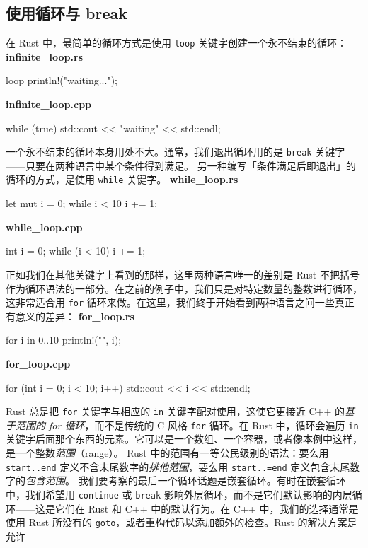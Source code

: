\subsection{使用循环与 break}
\label{idx:idx_4c4b7ee7}
在 Rust 中，最简单的循环方式是使用 \texttt{loop} 关键字创建一个永不结束的循环：
\textbf{infinite\_\allowbreak{}loop.\allowbreak{}rs}
\begin{codebox}[text]
loop {
    println!("waiting...");
}
\end{codebox}
\textbf{infinite\_\allowbreak{}loop.\allowbreak{}cpp}
\begin{codebox}[rust]
while (true) {
    std::cout << "waiting" << std::endl;
}
\end{codebox}
一个永不结束的循环本身用处不大。通常，我们退出循环用的是
\label{idx:idx_7ab2df65}
\texttt{break} 关键字——只要在两种语言中某个条件得到满足。
另一种编写「条件满足后即退出」的循环的方式，是使用 \texttt{while} 关键字。
\textbf{while\_\allowbreak{}loop.\allowbreak{}rs}
\begin{codebox}[rust]
let mut i = 0;
while i < 10 {
    i += 1;
}
\end{codebox}
\textbf{while\_\allowbreak{}loop.\allowbreak{}cpp}
\begin{codebox}[text]
int i = 0;
while (i < 10) {
    i += 1;
}
\end{codebox}
\label{idx:idx_59fd020e}
正如我们在其他关键字上看到的那样，这里两种语言唯一的差别是 Rust 不把括号作为循环语法的一部分。在之前的例子中，我们只是对特定数量的整数进行循环，这非常适合用 \texttt{for} 循环来做。在这里，我们终于开始看到两种语言之间一些真正有意义的差异：
\textbf{for\_\allowbreak{}loop.\allowbreak{}rs}
\begin{codebox}[text]
for i in 0..10 {
    println!("{}", i);
}
\end{codebox}
\textbf{for\_\allowbreak{}loop.\allowbreak{}cpp}
\begin{codebox}[rust]
for (int i = 0; i < 10; i++) {
    std::cout << i << std::endl;
}
\end{codebox}
\label{idx:idx_d25c919d}
Rust 总是把 \texttt{for} 关键字与相应的 \texttt{in} 关键字配对使用，这使它更接近 C++ 的\emph{基于范围的 for 循环}，而不是传统的 C 风格 \texttt{for} 循环。在 Rust 中，循环会遍历 \texttt{in} 关键字后面那个东西的元素。它可以是一个数组、一个容器，或者像本例中这样，是一个整数\emph{范围}（range）。
Rust 中的范围有一等公民级别的语法：要么用 \texttt{start..end} 定义不含末尾数字的\emph{排他范围}，要么用 \texttt{start..=end} 定义包含末尾数字的\emph{包含范围}。
我们要考察的最后一个循环话题是嵌套循环。有时在嵌套循环中，我们希望用 \texttt{continue} 或 \texttt{break} 影响外层循环，而不是它们默认影响的内层循环——这是它们在 Rust 和 C++ 中的默认行为。在 C++ 中，我们的选择通常是使用 Rust 所没有的 \texttt{goto}，或者重构代码以添加额外的检查。Rust 的解决方案是允许
